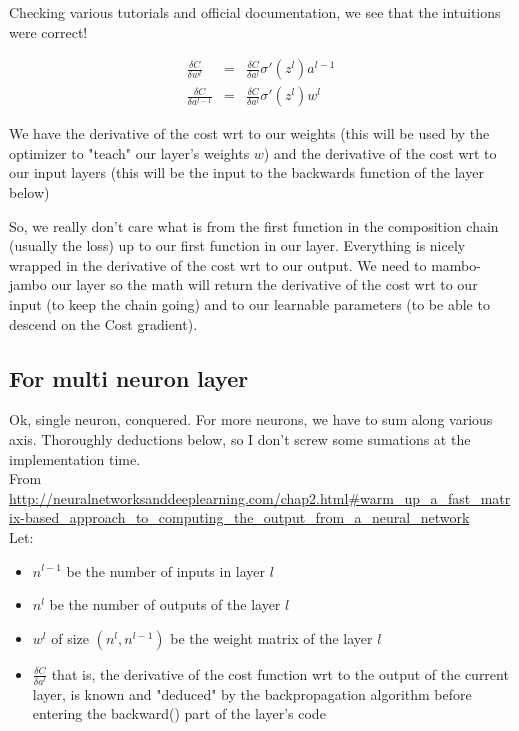 \documentclass{article}
\begin{document}
Checking various tutorials and official documentation, we see that the intuitions were correct!

\begin{eqnarray}
	\frac{\delta C}{\delta w^l} &=&\frac{\delta C}{\delta a^l} \sigma ' (z^l) a^{l-1}	 \\
	\frac{\delta C}{\delta a^{l-1}}&=&\frac{\delta C}{\delta a^l} \sigma ' (z^l) w^l
\end{eqnarray}

We have the derivative of the cost wrt to our weights (this will be used by the optimizer to "teach" our layer's weights $w$) and the derivative of the cost wrt to our input layers (this will be the input to the backwards function of the layer below)

So, we really don't care what is from the first function in the composition chain (usually the loss) up to our first function in our layer. Everything is nicely wrapped in the derivative of the cost wrt to our output. We need to mambo-jambo our layer so the math will return the derivative of the cost wrt to our input (to keep the chain going) and to our learnable parameters (to be able to descend on the Cost gradient).


\subsection{For multi neuron layer}

Ok, single neuron, conquered. For more neurons, we have to sum along various axis. Thoroughly deductions below, so I don't screw some sumations at the implementation time.\\


From \url{http://neuralnetworksanddeeplearning.com/chap2.html#warm_up_a_fast_matrix-based_approach_to_computing_the_output_from_a_neural_network} \\

Let:

\begin{itemize}
	\item $n^{l-1}$ be the number of inputs in layer $l$
	\item $n^l$ be the number of outputs of the layer $l$
	\item $w^l$ of size $(n^l, n^{l-1})$ be the weight matrix of the layer $l$
	\item $\frac{\delta C}{\delta a^l}$ that is, the derivative of the cost function wrt to the output of the current layer, is known and "deduced" by the backpropagation algorithm before entering the backward() part of the layer's code
\end{itemize}
\end{document}
